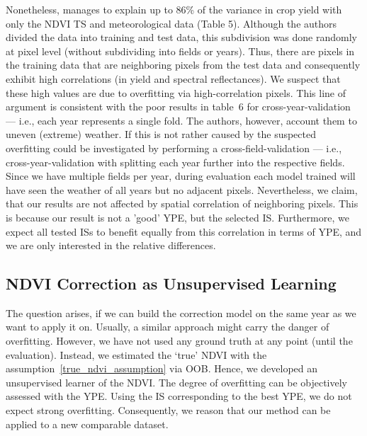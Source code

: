 {{        Nonetheless, \cite{perichPixelbasedCropYield2022} manages to explain up to 86\% of the variance in crop yield with only the NDVI TS and meteorological data (Table 5).  Although the authors divided the data into training and test data, this subdivision was done randomly at pixel level (without subdividing into fields or years). Thus, there are pixels in the training data that are neighboring pixels from the test data and consequently exhibit high correlations (in yield and spectral reflectances). We suspect that these high values are due to overfitting via high-correlation pixels. This line of argument is consistent with the poor results in table~6 for cross-year-validation --- i.e., each year represents a single fold. The authors, however, account them to uneven (extreme) weather.  If this is not rather caused by the suspected overfitting could be investigated by performing a cross-field-validation --- i.e., cross-year-validation with splitting each year further into the respective fields. Since we have multiple fields per year, during evaluation each model trained will have seen the weather of all years but no adjacent pixels. %
        Nevertheless, we claim, that our results are not affected by spatial correlation of neighboring pixels. This is because our result is not a 'good' YPE, but the selected IS. Furthermore, we expect all tested ISs to benefit equally from this correlation in terms of YPE, and we are only interested in the relative differences.  
    }

    \subsection{NDVI Correction as Unsupervised Learning}
        The question arises, if we can build the correction model on the same year as we want to apply it on. Usually, a similar approach might carry the danger of overfitting. However, we have not used any ground truth at any point (until the evaluation). Instead, we estimated the `true' NDVI with the assumption~\ref{true_ndvi_assumption} via OOB. Hence, we developed an unsupervised learner of the NDVI. The degree of overfitting can be objectively assessed with the YPE. Using the IS corresponding to the best YPE, we do not expect strong overfitting. Consequently, we reason that our method can be applied to a new comparable dataset.
}

